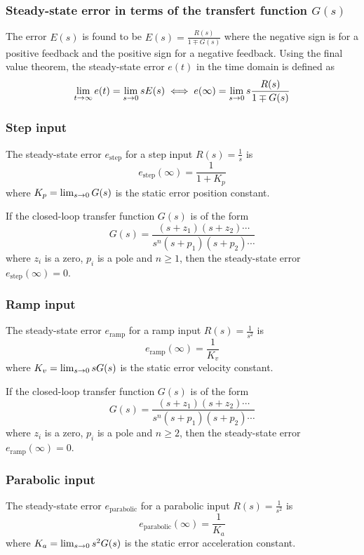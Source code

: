 \documentclass[10pt, twocolumn]{article}
\begin{document}
\subsubsection{Steady-state error in terms of the transfert function \(G(s)\)}
The error \(E(s)\) is found to be \(E(s) = \frac{R(s)}{1 \mp G(s)}\) where the negative sign is for a positive feedback and the positive sign for a negative feedback.
Using the final value theorem, the steady-state error \(e(t)\) in the time domain is defined as
\[
  \lim_{t \to \infty}{e(t)} = \lim_{s \to 0}{sE(s)}  \iff e(\infty) = \lim_{s \to 0}{s\frac{R(s)}{1 \mp G(s)}}
\]


\subsubsection{Step input}
The steady-state error \(e_\mathrm{step}\) for a step input \(R(s) = \frac{1}{s}\) is
\[
  e_\mathrm{step}(\infty) = \frac{1}{1 + K_p}
\]
where \(K_p = \lim_{s \to 0}{G(s)}\) is the static error position constant.

If the closed-loop transfer function \(G(s)\) is of the form
\[
  G(s) = \frac{(s + z_1)(s + z_2)\cdots}{s^n (s + p_1) (s + p_2) \cdots}
\]
where \(z_i\) is a zero, \(p_i\) is a pole and \(n \geqslant 1\), then the steady-state error \(e_\mathrm{step}(\infty) = 0\).



\subsubsection{Ramp input}
The steady-state error \(e_\mathrm{ramp}\) for a ramp input \(R(s) = \frac{1}{s^2}\) is
\[
  e_\mathrm{ramp}(\infty) = \frac{1}{K_v}
\]
where \(K_v = \lim_{s \to 0}{sG(s)}\) is the static error velocity constant.

If the closed-loop transfer function \(G(s)\) is of the form
\[
  G(s) = \frac{(s + z_1)(s + z_2)\cdots}{s^n (s + p_1) (s + p_2) \cdots}
\]
where \(z_i\) is a zero, \(p_i\) is a pole and \(n \geqslant 2\), then the steady-state error \(e_\mathrm{ramp}(\infty) = 0\).


\subsubsection{Parabolic input}
The steady-state error \(e_\mathrm{parabolic}\) for a parabolic input \(R(s) = \frac{1}{s^2}\) is
\[
  e_\mathrm{parabolic}(\infty) = \frac{1}{K_a}
\]
where \(K_a = \lim_{s \to 0}{s^2G(s)}\) is the static error acceleration constant.
\end{document}
